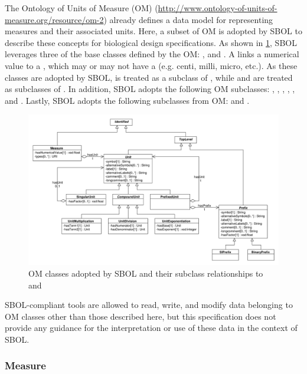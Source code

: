 The Ontology of Units of Measure (OM) (\url{http://www.ontology-of-units-of-measure.org/resource/om-2}) already defines a data model for representing measures and their associated units. Here, a subset of OM is adopted by SBOL to describe these concepts for biological design specifications. As shown in \ref{uml:om}, SBOL leverages three of the base classes defined by the OM: ,  and . A  links a numerical value to a , which may or may not have a  (e.g. centi, milli, micro, etc.). As these classes are adopted by SBOL,  is treated as a subclass of , while  and  are treated as subclasses of . In addition, SBOL adopts the following OM  subclasses: , , , , , and . Lastly, SBOL adopts the following  subclasses from OM:  and .

\begin{figure}[ht]
\begin{center}
\includegraphics[width=\linewidth]{uml/om}
\caption[]{OM classes adopted by SBOL and their subclass relationships to  and }
\label{uml:om}
\end{center}
\end{figure}

SBOL-compliant tools are allowed to read, write, and modify data belonging to OM classes other than those described here, but this specification does not provide any guidance for the interpretation or use of these data in the context of SBOL.

\subsubsection{Measure}
\label{sec:Measure}

